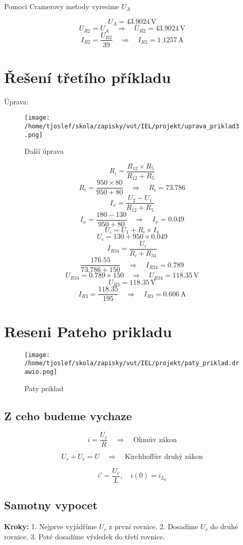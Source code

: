 \documentclass{article}
\begin{document}
Pomoci Cramerovy metody vyresime \( U_A \)

\[
    U_A = 43.9024 \, \text{V}
\]
\[
    U_{R2} = U_A  \quad \Rightarrow \quad U_{R2} = 43.9024 \, \text{V}
\]
\[
    I_{R2} = \frac{U_{R2}}{39} \quad \Rightarrow \quad I_{R2} = 1.1257 \, \text{A}
\]
\section{Řešení třetího příkladu}
Úprava:

\begin{figure}[!ht]
  \centering
  \texttt{[image: /home/tjoslef/skola/zapisky/vut/IEL/projekt/uprava\_priklad3.png]}
  \caption{Další úprava}
  \label{fig:upravapriklad3}
\end{figure}

\[
    R_i = \frac{R_{12} \times R_5}{R_{12} + R_5}
\]
\[
    R_i = \frac{950 \times 80}{950 + 80} \quad \Rightarrow \quad R_i = 73.786
\]
\[
    I_x = \frac{U_2 - U_1}{R_{12} + R_5}
\]
\[
    I_x = \frac{180 - 130}{950 + 80} \quad \Rightarrow \quad I_x = 0.049
\]
\[
    U_i = U_1 + R_i \times I_x
\]
\[
    U_i = 130 + 950 \times 0.049
\]
\[
    I_{R34} = \frac{U_i}{R_i + R_{34}}
\]
\[
    \frac{176.55}{73.786 + 150} \quad \Rightarrow \quad I_{R34} = 0.789
\]
\[
    U_{R34} = 0.789 \times 150 \quad \Rightarrow \quad U_{R34} = 118.35 \, \text{V}
\]
\[
    U_{R3} = 118.35 \, \text{V}
\]
\[
    I_{R3} = \frac{118.35}{195} \quad \Rightarrow \quad I_{R3} = 0.606 \, \text{A}
\]
\section{Reseni Pateho prikladu}
\begin{figure}[!ht]
  \centering
  \texttt{[image: /home/tjoslef/skola/zapisky/vut/IEL/projekt/paty\_priklad.drawio.png]}
  \caption{Paty priklad}
  \label{fig:priklad5}
\end{figure}
\subsection*{Z ceho budeme vychaze}
\[
i = \frac{U_r}{R} \quad \Rightarrow \quad \text{Ohmův zákon}
\]

\[
U_r + U_r = U \quad \Rightarrow \quad \text{Kirchhoffův druhý zákon}
\]

\[
i' = \frac{U_c}{L}, \quad i(0) = i_{L_0}
\]
\subsection*{Samotny vypocet}
\textbf{Kroky:}
1. Nejprve vyjádříme \( U_r \) z první rovnice.
2. Dosadíme \( U_r \) do druhé rovnice.
3. Poté dosadíme výsledek do třetí rovnice.
\end{document}
